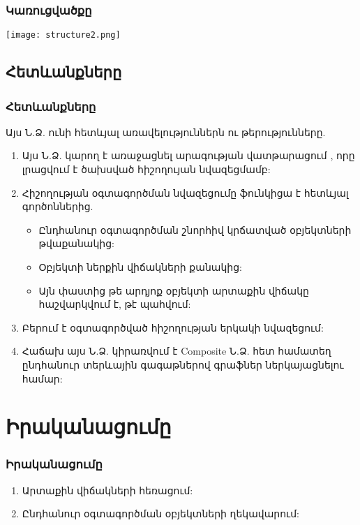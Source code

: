 \documentclass{beamer}
\begin{document}
\begin{frame}\frametitle{Կառուցվածքը}
\begin{center}
    \texttt{[image: structure2.png]}
\end{center}
\end{frame}

\subsection{Հետևանքները}
\begin{frame}\frametitle{Հետևանքները}
Այս Ն.Ձ. ունի հետևյալ առավելություններն ու թերությունները.
\vfill
{}
\begin{enumerate}
    \item Այս Ն.Ձ. կարող է առաջացնել արագության վատթարացում , որը
    լրացվում է ծախսված հիշողույան նվազեցմամբ: \vfill
    \item Հիշողության օգտագործման նվազեցումը ֆունկիցա է հետևյալ գործոններից. \vfill
    \begin{itemize}
        \item Ընդհանուր օգտագործման շնորհիվ կրճատված օբյեկտների թվաքանակից: \vfill
        \item Օբյեկտի ներքին վիճակների քանակից:
        \item Այն փաստից թե արդյոք օբյեկտի արտաքին վիճակը հաշվարկվում է, թէ պահվում: \vfill
    \end{itemize}
    \item Բերում է օգտագործված հիշողության երկակի նվազեցում: \vfill
    \item Հաճախ այս Ն.Ձ. կիրառվում է Composite Ն.Ձ. հետ համատեղ ընդհանուր
    տերևային գագաթներով գրաֆներ ներկայացնելու համար:
\end{enumerate}
\end{frame}

\section{Իրականացումը}
\begin{frame}\frametitle{Իրականացումը}
\begin{enumerate}
    \item Արտաքին վիճակների հեռացում: \vfill
    \item Ընդհանուր օգտագործման օբյեկտների ղեկավարում:
\end{enumerate}
\end{frame}
\end{document}
